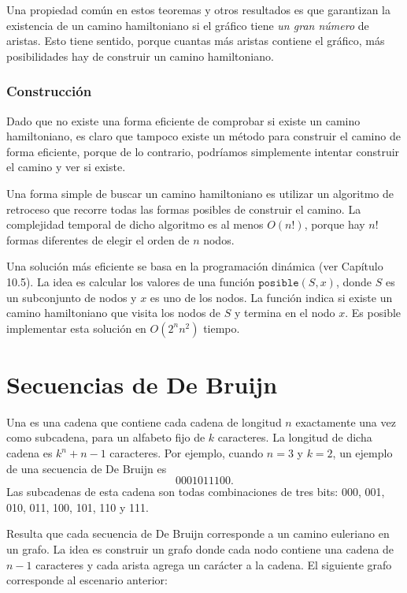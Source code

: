 Una propiedad común en estos teoremas y otros resultados es
que garantizan la existencia de un camino hamiltoniano
si el gráfico tiene \emph{un gran número} de aristas.
Esto tiene sentido, porque cuantas más aristas contiene el gráfico,
más posibilidades hay de construir un camino hamiltoniano.

\subsubsection{Construcción}
Dado que no existe una forma eficiente de comprobar si existe un 
camino hamiltoniano, es claro que tampoco existe un método 
para construir el camino de forma eficiente, porque de 
lo contrario, podríamos simplemente intentar construir el 
camino y ver si existe.

Una forma simple de buscar un camino hamiltoniano es utilizar un algoritmo 
de retroceso que recorre todas las formas posibles de construir el camino.
La complejidad temporal de dicho algoritmo es al menos $O(n!)$,
porque hay $n!$ formas diferentes de elegir el orden de $n$ nodos.

Una solución más eficiente se basa en la programación dinámica
(ver Capítulo 10.5).
La idea es calcular los valores
de una función $\texttt{posible}(S,x)$,
donde $S$ es un subconjunto de nodos y $x$
es uno de los nodos.
La función indica si existe un camino hamiltoniano
que visita los nodos de $S$ y termina en el nodo $x$.
Es posible implementar esta solución en $O(2^n n^2)$ tiempo.

\section{Secuencias de De Bruijn}


Una 
es una cadena que contiene
cada cadena de longitud $n$
exactamente una vez como subcadena, para un alfabeto fijo
de $k$ caracteres.
La longitud de dicha cadena es
$k^n+n-1$ caracteres.
Por ejemplo, cuando $n=3$ y $k=2$,
un ejemplo de una secuencia de De Bruijn es
\[0001011100.\]
Las subcadenas de esta cadena son todas
combinaciones de tres bits:
000, 001, 010, 011, 100, 101, 110 y 111.

Resulta que cada secuencia de De Bruijn
corresponde a un camino euleriano en un grafo.
La idea es construir un grafo donde
cada nodo contiene una cadena de $n-1$ caracteres
y cada arista agrega un carácter a la cadena.
El siguiente grafo corresponde al escenario anterior:

